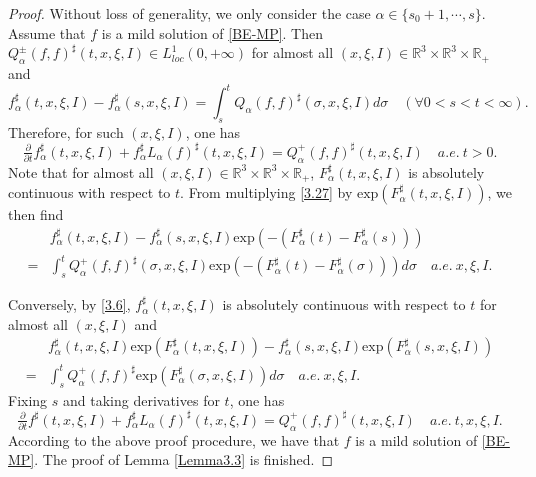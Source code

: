 \documentclass[reqno,11pt]{amsart}
\numberwithin{equation}{section}
\def\R{\mathbb{R}}
\def\exp{\mathrm{exp}}
\begin{document}
\begin{proof}

Without loss of generality, we only consider the case $\alpha \in \{ s_0 + 1, \cdots, s \}$. Assume that $f$ is a mild solution of \eqref{BE-MP}. Then $Q^\pm_\alpha (f,f)^\sharp (t,x,\xi ,I) \in L^1_{loc}(0,+\infty )$ for almost all $(x,\xi ,I) \in \R^3 \times \R^3\times \R_+ $ and
	\begin{equation*}
		f^\sharp_\alpha (t,x,\xi ,I) - f^\sharp_\alpha (s,x,\xi ,I) =\int_{s}^{t} Q_\alpha (f,f)^\sharp (\sigma ,x,\xi ,I)d\sigma \quad (\forall 0<s<t<\infty).
	\end{equation*}
	Therefore, for such $(x,\xi ,I)$, one has
	\begin{equation}\label{3.27}
		\tfrac{\partial}{\partial t} f^\sharp_\alpha (t,x,\xi ,I) + f^\sharp_\alpha L_\alpha (f)^\sharp (t,x,\xi ,I) = Q^+_\alpha (f,f)^\sharp (t,x,\xi ,I) \quad a.e.\ t>0.
	\end{equation}
Note that for almost all $(x,\xi ,I)\in \R^3 \times \R^3\times \R_+$, $ F^\sharp_\alpha(t,x,\xi ,I)$ is absolutely continuous with respect to $t$. From multiplying \eqref{3.27} by $\exp (F^\sharp_\alpha(t,x,\xi ,I))$, we then find 
	\begin{equation*}
		\begin{aligned}
			&f^\sharp_\alpha (t,x,\xi ,I) -f^\sharp_\alpha (s,x,\xi ,I) \exp(-(F^\sharp _{\alpha} (t)-F^\sharp _{\alpha} (s)))\\
			=&\int_{s}^{t} Q^+_{\alpha } (f,f) ^\sharp (\sigma,x,\xi ,I) \exp(-(F^\sharp _{\alpha } (t)- F^\sharp _{\alpha } (\sigma))) d\sigma \quad a.e.\ x,\xi ,I.
		\end{aligned}
	\end{equation*} 

Conversely, by \eqref{3.6}, $f^\sharp_\alpha (t,x,\xi ,I)$ is absolutely continuous with respect to $t$ for almost all $(x,\xi ,I)$ and
	\begin{equation*}
		\begin{aligned}
			&f^\sharp_\alpha (t,x,\xi ,I)\exp (F^\sharp _{\alpha}(t,x,\xi ,I)) -f^\sharp_\alpha (s,x,\xi ,I) \exp(F^\sharp _{\alpha} (s,x,\xi ,I))\\
			=&\int_{s}^{t} Q^+_{\alpha } (f,f) ^\sharp \exp( F^\sharp _{\alpha } (\sigma,x,\xi ,I)) d\sigma \quad a.e.\ x,\xi ,I.
		\end{aligned}
	\end{equation*} 
	Fixing $s$ and taking derivatives for $t$, one has
	\begin{equation*}
		\tfrac{\partial}{\partial t}f^\sharp (t,x,\xi ,I)+f^\sharp_\alpha L_\alpha (f)^\sharp (t,x,\xi ,I) = Q^+_\alpha (f,f)^\sharp (t,x,\xi ,I) \quad a.e.\ t,x,\xi ,I.
	\end{equation*}
	According to the above proof procedure, we have that $f$ is a mild solution of \eqref{BE-MP}. The proof of Lemma \ref{Lemma3.3} is finished.
\end{proof}
\end{document}
